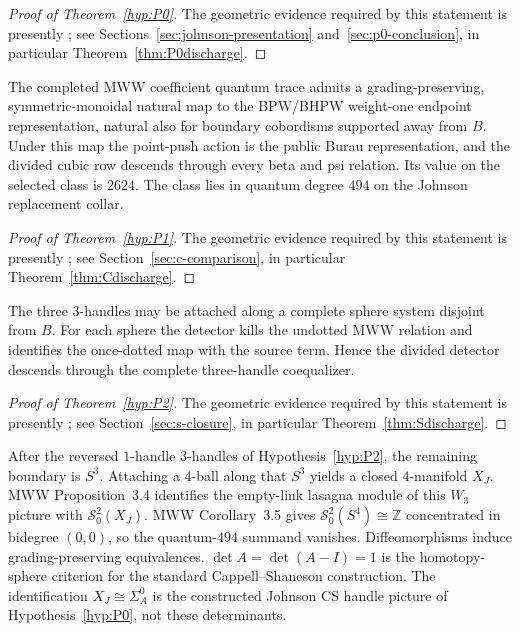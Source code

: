 \begin{proof}[Proof of Theorem~\ref{hyp:P0}]
The geometric evidence required by this statement is presently \Open;
see Sections~\ref{sec:johnson-presentation} and~\ref{sec:p0-conclusion},
in particular Theorem~\ref{thm:P0discharge}.
\end{proof}

\begin{theorem}\label{hyp:P1}
The completed MWW coefficient quantum trace admits a grading-preserving,
symmetric-monoidal natural map to the BPW/BHPW weight-one endpoint
representation, natural also for boundary cobordisms supported away from
$B$.  Under this map the point-push action is the public Burau
representation, and the divided cubic row descends through every beta and psi
relation.  Its value on the selected class is $2624$.
The class lies in quantum degree $494$ on the Johnson replacement collar.
\end{theorem}

\begin{proof}[Proof of Theorem~\ref{hyp:P1}]
The geometric evidence required by this statement is presently \Open;
see Section~\ref{sec:c-comparison}, in particular Theorem~\ref{thm:Cdischarge}.
\end{proof}

\begin{theorem}\label{hyp:P2}
The three $3$-handles may be
attached along a complete sphere system disjoint from $B$.  For each sphere
the detector kills the undotted MWW relation and identifies the once-dotted
map with the source term.  Hence the divided detector descends through the
complete three-handle coequalizer.
\end{theorem}

\begin{proof}[Proof of Theorem~\ref{hyp:P2}]
The geometric evidence required by this statement is presently \Open;
see Section~\ref{sec:s-closure}, in particular Theorem~\ref{thm:Sdischarge}.
\end{proof}

\begin{theorem}\label{hyp:P3}
After the reversed $1$-handle $3$-handles of Hypothesis~\ref{hyp:P2}, the
remaining boundary is $S^3$.  Attaching a $4$-ball along that $S^3$ yields a
closed $4$-manifold $X_J$.  MWW Proposition~3.4 identifies the empty-link
lasagna module of this $W_3$ picture with $\mathcal S^2_0(X_J)$.  MWW
Corollary~3.5 gives $\mathcal S^2_0(S^4)\cong\mathbb Z$ concentrated in
bidegree $(0,0)$, so the quantum-$494$ summand vanishes.  Diffeomorphisms
induce grading-preserving equivalences.  $\det A=\det(A-I)=1$ is the
homotopy-sphere criterion for the standard Cappell--Shaneson construction.
The identification $X_J\cong\Sigma_A^0$ is the constructed Johnson CS
handle picture of Hypothesis~\ref{hyp:P0}, not these determinants.
\end{theorem}

